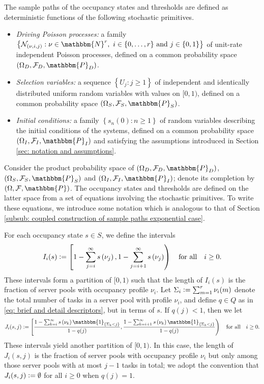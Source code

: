 \documentclass[a4paper, 12pt]{article}
\theoremstyle{definition}
\newcommand{\ind}[1]{\mathbbm{1}_{\left\{#1\right\}}}
\newcommand{\set}[2]{\left\{#1 : #2\right\}}
\newcommand{\defeq}{\vcentcolon=}
\newcommand{\prob}{\mathbbm{P}}
\newcommand{\calF}{\mathcal{F}}
\newcommand{\calN}{\mathcal{N}}
\newcommand{\N}{\mathbbm{N}}
\begin{document}
The sample paths of the occupancy states and thresholds are defined as deterministic functions of the following stochastic primitives.

\begin{itemize}
	\item \textit{Driving Poisson processes:} a family $\set{\calN_{(\nu, i, j)}}{\nu \in \N^r,\ i \in \{0, \dots, r\}\ \text{and}\ j \in \{0, 1\}}$ of unit-rate independent Poisson processes, defined on a common probability space $(\Omega_D, \calF_D, \prob_D)$.
	
	\item \textit{Selection variables:} a sequence $\set{U_j}{j \geq 1}$ of independent and identically distributed uniform random variables with values on $[0, 1)$, defined on a common probability space $(\Omega_S, \calF_S, \prob_S)$.
	
	\item \textit{Initial conditions:} a family $\set{s_n(0)}{n \geq 1}$ of random variables describing the initial conditions of the systems, defined on a common probability space $(\Omega_I, \calF_I, \prob_I)$ and satisfying the assumptions introduced in Section \ref{sec: notation and assumptions}.
\end{itemize}

Consider the product probability space of $(\Omega_D, \calF_D, \prob_D)$, $(\Omega_S, \calF_S, \prob_S)$ and $(\Omega_I, \calF_I, \prob_I)$; denote its completion by $(\Omega, \calF, \prob)$. The occupancy states and thresholds are defined on the latter space from a set of equations involving the stochastic primitives. To write these equations, we introduce some notation which is analogous to that of Section \ref{subsub: coupled construction of sample paths exponential case}.

For each occupancy state $s \in S$, we define the intervals
\begin{equation*}
	I_i(s) \defeq \left[1 - \sum_{j = i}^\infty s\left(\nu_j\right), 1 - \sum_{j = i + 1}^\infty s\left(\nu_j\right)\right) \quad \text{for all} \quad i \geq 0.
\end{equation*}
These intervals form a partition of $[0, 1)$ such that the length of $I_i(s)$ is the fraction of server pools with occupancy profile $\nu_i$. Let $\Sigma_i \defeq \sum_{m = 1}^r \nu_i(m)$ denote the total number of tasks in a server pool with profile $\nu_i$, and define $q \in Q$ as in \eqref{eq: brief and detail descriptors}, but in terms of $s$. If $q(j) < 1$, then we let
\begin{equation*}
	J_i(s, j) \defeq \left[\frac{1 - \sum_{k = i}^\infty s\left(\nu_k\right) \ind{\Sigma_k < j}}{1 - q(j)}, \frac{1 - \sum_{k = i + 1}^\infty s\left(\nu_k\right)\ind{\Sigma_k < j}}{1 - q(j)}\right) \quad \text{for all} \quad i \geq 0.
\end{equation*}
These intervals yield another partition of $[0, 1)$. In this case, the length of $J_i(s, j)$ is the fraction of server pools with occupancy profile $\nu_i$ but only among those server pools with at most $j - 1$ tasks in total; we adopt the convention that $J_i(s, j) \defeq \emptyset$ for all $i \geq 0$ when $q(j) = 1$.
\end{document}
